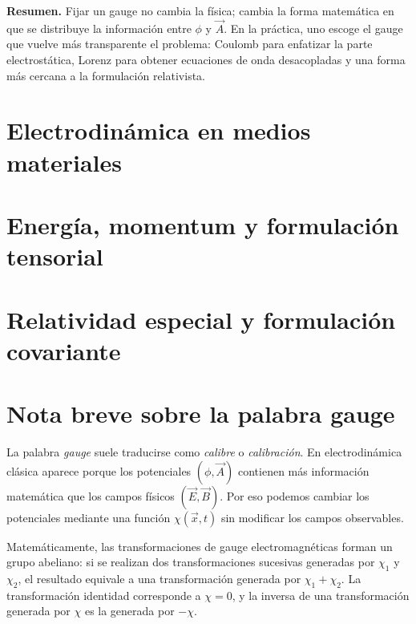 \documentclass[12pt,a4paper]{article}
\theoremstyle{definition}
\theoremstyle{plain}
\numberwithin{equation}{section}
\theoremstyle{remark}
\newcommand{\E}{\vec{E}}
\newcommand{\B}{\vec{B}}
\begin{document}
\begin{cajaidea}
\textbf{Resumen.} Fijar un gauge no cambia la física; cambia la forma matemática en que se distribuye la información entre $\phi$ y $\vec A$. En la práctica, uno escoge el gauge que vuelve más transparente el problema: Coulomb para enfatizar la parte electrostática, Lorenz para obtener ecuaciones de onda desacopladas y una forma más cercana a la formulación relativista.
\end{cajaidea}


\section{Electrodinámica en medios materiales}


\section{Energía, momentum y formulación tensorial}


\section{Relatividad especial y formulación covariante}



\appendix


\section{Nota breve sobre la palabra gauge}
\label{ap:gauge-teorias}

La palabra \emph{gauge} suele traducirse como \emph{calibre} o \emph{calibración}. En electrodinámica clásica aparece porque los potenciales $(\phi,\vec A)$ contienen más información matemática que los campos físicos $(\E,\B)$. Por eso podemos cambiar los potenciales mediante una función $\chi(\vec x,t)$ sin modificar los campos observables.

Matemáticamente, las transformaciones de gauge electromagnéticas forman un grupo abeliano: si se realizan dos transformaciones sucesivas generadas por $\chi_1$ y $\chi_2$, el resultado equivale a una transformación generada por $\chi_1+\chi_2$. La transformación identidad corresponde a $\chi=0$, y la inversa de una transformación generada por $\chi$ es la generada por $-\chi$.
\end{document}
